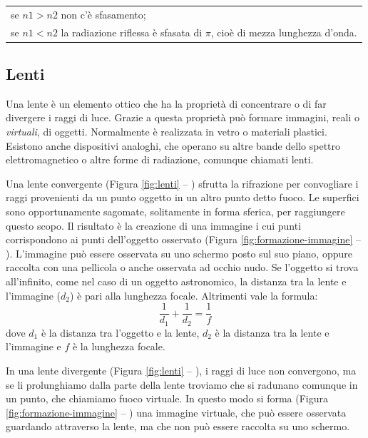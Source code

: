 \begin{tabular}{l}
se $n1>n2$ non c'è sfasamento;\\
se $n1<n2$ la radiazione riflessa è sfasata di $\pi$, cioè di mezza lunghezza d'onda.\\
\end{tabular}


\subsection{Lenti}
Una lente è un elemento ottico che ha la proprietà di concentrare o di far divergere i raggi di luce. Grazie a questa proprietà può formare immagini, reali o \emph{virtuali}, di oggetti.
Normalmente è realizzata in vetro o materiali plastici. Esistono anche dispositivi analoghi, che operano su altre bande dello spettro elettromagnetico o altre forme di radiazione, comunque chiamati lenti.

Una lente convergente (Figura \ref{fig:lenti} -- )
 sfrutta la rifrazione per convogliare i raggi provenienti da un
punto oggetto in un altro punto detto fuoco. Le superfici sono opportunamente
sagomate, solitamente in forma sferica, per raggiungere questo scopo. Il
risultato è la creazione di una immagine i cui punti corrispondono ai punti
dell'oggetto osservato (Figura \ref{fig:formazione-immagine} -- ). L'immagine può essere osservata su uno schermo
posto sul suo piano, oppure raccolta con una pellicola o anche osservata ad
occhio nudo. Se l'oggetto si trova all'infinito, come nel caso di un oggetto
astronomico, la distanza tra la lente e l'immagine ($d_2$) è pari alla
lunghezza focale. Altrimenti vale la formula:   \[ \frac{1}{d_1} +
\frac{1}{d_2} = \frac{1}{f} \] dove $d_1$ è la distanza tra l'oggetto e la
lente, $d_2$ è la distanza tra la lente e l'immagine e $f$ è la lunghezza
focale.

In una lente divergente (Figura \ref{fig:lenti} -- ),
i raggi di luce non convergono, ma se li prolunghiamo dalla
parte della lente troviamo che si radunano comunque in un punto, che chiamiamo
fuoco virtuale. In questo modo si forma (Figura \ref{fig:formazione-immagine} -- ) una immagine virtuale, che può
essere osservata guardando attraverso la lente, ma che non può essere raccolta
su uno schermo.


